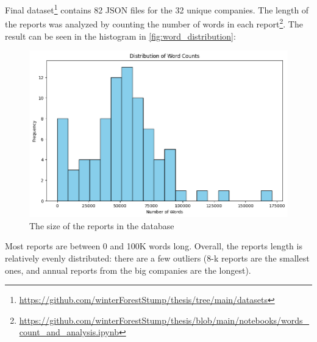 Final dataset\footnote{\url{https://github.com/winterForestStump/thesis/tree/main/datasets}} contains 82 JSON files for the 32 unique companies. The length of the reports was analyzed by counting the number of words in each report\footnote{\url{https://github.com/winterForestStump/thesis/blob/main/notebooks/words_count_and_analysis.ipynb}}. The result can be seen in the histogram in \autoref{fig:word_distribution}:
\begin{figure}[h!]
\centering
\includegraphics[width=1\textwidth]{Figures/word_distribution.png}
\caption{The size of the reports in the database}
\label{fig:word_distribution}
\end{figure}

Most reports are between 0 and 100K words long. Overall, the reports length is relatively evenly distributed: there are a few outliers (8-k reports are the smallest ones, and annual reports from the big companies are the longest).

